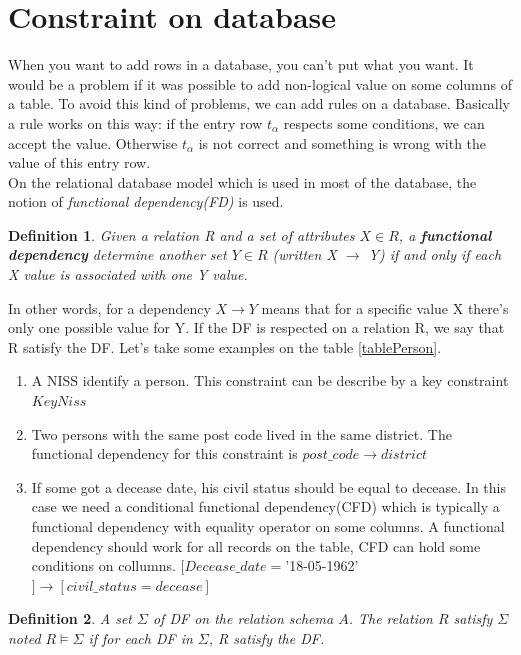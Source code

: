 \documentclass[letterpaper, 12pt]{report}
\newtheorem{mydef}{Definition}
\begin{document}
\newpage

\section{Constraint on database}

When you want to add rows in a database, you can't put what you want. It would be a problem if it was possible to add non-logical value on some columns of a table. To avoid this kind of problems, we can add rules on a database. Basically a rule works on this way: if the entry row $t_\alpha$ respects some conditions, we can accept the value. Otherwise $t_\alpha$ is not correct and something is wrong with the value of this entry row.\\

On the relational database model which is used in most of the database, the notion of \emph{functional dependency(FD)} is used. 

\begin{mydef}
Given a relation R and a set of attributes $X \in R$, a \textbf{functional dependency} determine another set $Y \in R$ (written X $\rightarrow$ Y) if and only if each X value is associated with one Y value.
\end{mydef} 

In other words, for a dependency $X \rightarrow Y$ means that for a specific value X there's only one possible value for Y. If the DF is respected on a relation R, we say that R satisfy the DF. Let's take some examples on the table \ref{tablePerson}.

\begin{enumerate}
\item A NISS identify a person. This constraint can be describe by a key constraint $Key{Niss}$
\item Two persons with the same post code lived in the same district. The functional dependency for this constraint is $post\_code \rightarrow district$
\item If some got a decease date, his civil status should be equal to decease. In this case we need a conditional functional dependency(CFD) which is typically a functional dependency with equality operator on some columns. A functional dependency should work for all records on the table, CFD can hold some conditions on collumns. $[Decease\_date = $'18-05-1962'$] \rightarrow [civil\_status = decease]$
\end{enumerate}
 
\begin{mydef}
A set $\Sigma$ of DF on the relation schema $A$. The relation $R$ satisfy $\Sigma$ noted $R \models \Sigma$ if for each DF in $\Sigma$, R satisfy the DF.
\end{mydef}
\end{document}
